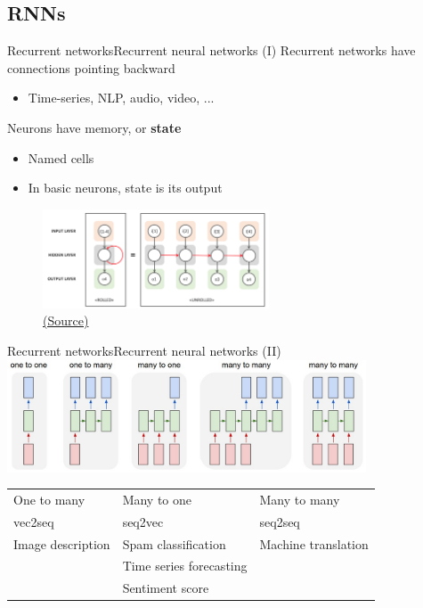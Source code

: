 \documentclass[10pt,compress]{beamer} %
\begin{document}
\subsection{RNNs}
\begin{frame}{Recurrent networks}{Recurrent neural networks (I)}
	Recurrent networks have connections pointing backward
    \begin{itemize}
        \item Time-series, NLP, audio, video, ...
    \end{itemize}
    Neurons have memory, or \textbf{state}
    \begin{itemize}
        \item Named \alert{cells}
        \item In basic neurons, state is its output
    \end{itemize}

	\begin{figure}
        \includegraphics[width=0.6\textwidth]{figs/recurrent.png}\\
	    \scriptsize\href{https://www.bouvet.no/bouvet-deler/explaining-recurrent-neural-networks}{(Source)}
	\end{figure}
\end{frame}

\begin{frame}{Recurrent networks}{Recurrent neural networks (II)}
	\centering
        \includegraphics[width=0.8\textwidth]{figs/seq2seq.jpg}

    \begin{table}
    \centering
    \begin{tabular}{l|l|l}
    One to many & Many to one & Many to many\\
    vec2seq     & seq2vec     & seq2seq\\\hline
    Image description & Spam classification & Machine translation \\
                & Time series forecasting & \\
                & Sentiment score         & \\
    \end{tabular}
    \end{table}
\end{frame}
\end{document}
